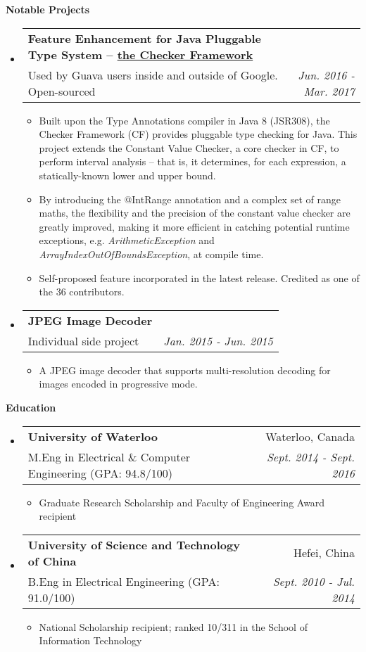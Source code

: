 \documentclass[letterpaper,10pt]{article}
\makeatletter
\newcommand{\resitem}[1]{\item #1 \vspace{-2pt}}
\newcommand{\resheading}[1]{{\large \colorbox{mygrey}{\begin{minipage}{\textwidth}{\textbf{#1 \vphantom{p\^{E}}}}\end{minipage}}}}
\newcommand{\ressubheading}[4]{
\begin{tabular*}{7.0in}{l@{\extracolsep{\fill}}r}
    \textbf{#1} & #2 \\
    #3 & \textit{#4} \\
\end{tabular*}\vspace{-6pt}}
\makeatother
\begin{document}
\resheading{Notable Projects}
\begin{itemize}
\itemsep0em
\item
	\ressubheading{Feature Enhancement for Java Pluggable Type System -- \href{https://github.com/typetools/checker-framework}{the Checker Framework}}{}{Used by Guava users inside and outside of Google. Open-sourced}{Jun. 2016 - Mar. 2017}
	\begin{itemize}
        \resitem{Built upon the Type Annotations compiler in Java 8 (JSR308), the Checker Framework (CF) provides pluggable type checking for Java. This project extends the Constant Value Checker, a core checker in CF, to perform interval analysis -- that is, it determines, for each expression, a statically-known lower and upper bound.}
        \resitem{By introducing the @IntRange annotation and a complex set of range maths, the flexibility and the precision of the constant value checker are greatly improved, making it more efficient in catching potential runtime exceptions, e.g. \textit{ArithmeticException} and \textit{ArrayIndexOutOfBoundsException}, at compile time.}
        \resitem{Self-proposed feature incorporated in the latest release. Credited as one of the 36 contributors.}
	\end{itemize}
\item
	\ressubheading{JPEG Image Decoder}{}{Individual side project}{Jan. 2015 - Jun. 2015}
	\begin{itemize}
		\resitem{A JPEG image decoder that supports multi-resolution decoding for images encoded in progressive mode.}
	\end{itemize}
	
\end{itemize}

\resheading{Education}
\begin{itemize}
\itemsep0em
\item
	\ressubheading{University of Waterloo}{Waterloo, Canada}{M.Eng in Electrical \& Computer Engineering (GPA: 94.8/100)}{Sept. 2014 - Sept. 2016}
	\begin{itemize}
        \resitem{Graduate Research Scholarship and Faculty of Engineering Award recipient}
	\end{itemize}
\item
	\ressubheading{University of Science and Technology of China}{Hefei, China}{B.Eng in Electrical Engineering (GPA: 91.0/100)}{Sept. 2010 - Jul. 2014}
	\begin{itemize}
        \resitem{ National Scholarship recipient; ranked 10/311 in the School of Information Technology}
	\end{itemize}

\end{itemize}
\end{document}

